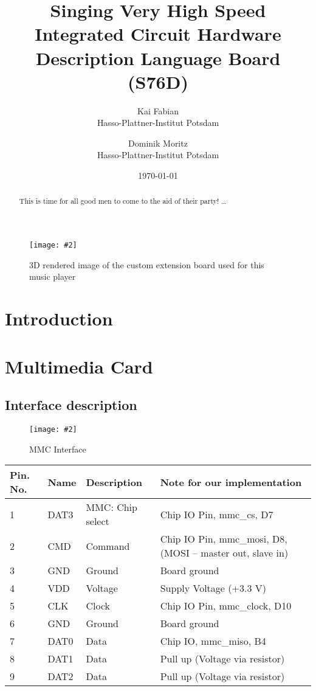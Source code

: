 \documentclass[12pt, a4paper]{article}
\title{Singing Very High Speed Integrated Circuit Hardware Description Language Board (S76D)}
\author{
        Kai Fabian \\
        Hasso-Plattner-Institut Potsdam\\
            \and
        Dominik Moritz \\
        Hasso-Plattner-Institut Potsdam\\
}
\date{\today}
\newcommand{\image}[4]{
	\begin{figure}[#4]               %
		\centering                     %
		\texttt{[image: \#2]} %
		\caption{#3}                   %
		\label{fig:#2}                 %
	\end{figure}                     %
}
\begin{document}
\maketitle

\image{0.7\textwidth}{render.png}{3D rendered image of the custom extension board used for this music player}{ht}

\begin{abstract}
This is time for all good men to come to the aid of their party! \ldots
\end{abstract}

\tableofcontents

\section{Introduction}

\section{Multimedia Card}

\subsection{Interface description}

\image{0.3\textwidth}{../mmc_pins.png}{MMC Interface}{ht}

\begin{table}
    \begin{tabular}{|l|l|l|p{8cm}|}
    \hline
Pin. No.   & Name    & Description	    & Note for our implementation \\ \hline
1	       & DAT3	 & MMC: Chip select & Chip IO Pin, mmc\_cs, D7 \\
2	       & CMD	 & Command 	        & Chip IO Pin,  mmc\_mosi, D8, (MOSI – master out, slave in) \\
3	       & GND	 & Ground	        & Board ground \\
4	       & VDD	 & Voltage	        & Supply Voltage (+3.3 V) \\
5	       & CLK	 & Clock	        & Chip IO Pin,  mmc\_clock, D10 \\
6	       & GND	 & Ground	        & Board ground \\
7	       & DAT0	 & Data	            & Chip IO,  mmc\_miso, B4 \\
8	       & DAT1	 & Data	            & Pull up (Voltage via resistor) \\
9	       & DAT2	 & Data	            & Pull up (Voltage via resistor) \\
	\hline
    \end{tabular}
\end{table}
\end{document}
